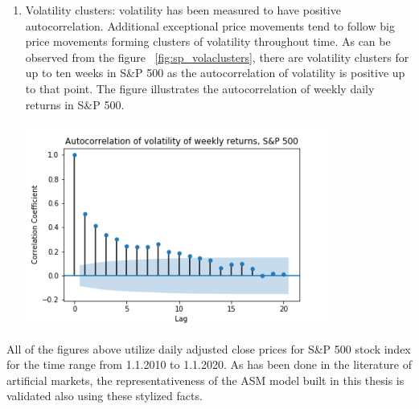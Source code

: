 \begin{enumerate}
\begin{minipage}{\linewidth}
        \label{fig:sp_autocorr}
    \end{minipage}
    \item Volatility clusters: volatility has been measured to have positive autocorrelation. 
          Additional exceptional price movements tend to follow big price movements forming clusters of volatility throughout time.
          As can be observed from the figure ~\ref{fig:sp_volaclusters}, there are volatility clusters for up to ten weeks in 
          S\&P 500 as the autocorrelation of volatility is positive up to that point. 
          The figure illustrates the autocorrelation of weekly daily returns in S\&P 500.  
    \par
    \begin{minipage}{\linewidth}
        \centering
        \includegraphics[width=10cm]{plots/S&P500_vola_autocorr.png}
        \label{fig:sp_volaclusters}
    \end{minipage}
\end{enumerate} 




All of the figures above utilize daily adjusted close prices for S\&P 500 stock index 
for the time range from 1.1.2010 to 1.1.2020. 
As has been done in the literature of artificial markets, the 
representativeness of the ASM model built in this thesis is validated also 
using these stylized facts.